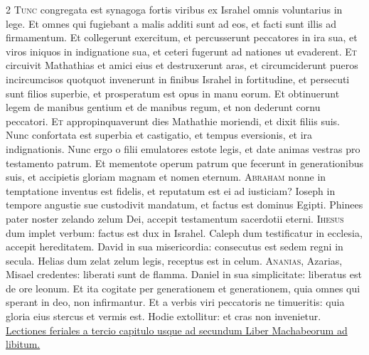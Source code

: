 \begin{multicols*}{2}
\lettrine[lines=2]{\zallmancaps \color{Blue} T}{unc} congregata est synagoga fortis viribus ex Israhel omnis voluntarius in lege. Et omnes qui fugiebant a malis additi sunt ad eos, et facti sunt illis ad firmamentum. Et collegerunt exercitum, et percusserunt peccatores in ira sua, et viros iniquos in indignatione sua, et ceteri fugerunt ad nationes ut evaderent.
\lettrine[lines=2]{\zallmancaps \color{Red} E}{t} circuivit Mathathias et amici eius et destruxerunt aras, et circumciderunt pueros incircumcisos quotquot invenerunt
in finibus Israhel in fortitudine, et persecuti sunt filios superbie, et prosperatum est opus in manu eorum. Et obtinuerunt legem de manibus gentium et de manibus regum, et non dederunt cornu peccatori.
\lettrine[lines=2]{\zallmancaps \color{Blue} E}{t} appropinquaverunt dies Mathathie moriendi, et dixit filiis suis. Nunc confortata est superbia et castigatio, et tempus eversionis, et ira indignationis. Nunc ergo o filii emulatores estote legis, et date animas vestras pro testamento patrum. Et mementote operum patrum que fecerunt in generationibus suis, et accipietis gloriam magnam et nomen eternum.
\lettrine[lines=2]{\zallmancaps \color{Red} A}{braham} nonne in temptatione inventus est fidelis, et reputatum est ei ad iusticiam? Ioseph in tempore angustie sue custodivit mandatum, et factus est dominus Egipti. Phinees pater noster zelando zelum Dei, accepit testamentum sacerdotii eterni.
\lettrine[lines=2]{\zallmancaps \color{Blue} I}{hesus} dum implet verbum: factus est dux in Israhel. Caleph dum testificatur in ecclesia, accepit hereditatem. David in sua misericordia: consecutus est sedem regni in secula. Helias dum zelat zelum legis, receptus est in celum.
\lettrine[lines=2]{\zallmancaps \color{Red} A}{nanias}, Azarias, Misael credentes: liberati sunt de flamma. Daniel in sua simplicitate: liberatus est de ore leonum. Et ita cogitate per generationem et generationem, quia omnes qui sperant in deo, non infirmantur. Et a verbis viri peccatoris ne timueritis: quia gloria eius stercus et vermis est. Hodie extollitur: et cras non invenietur.
\newline \ul{Lectiones feriales a tercio capitulo usque ad secundum Liber Machabeorum ad libitum.}

\end{multicols*}
